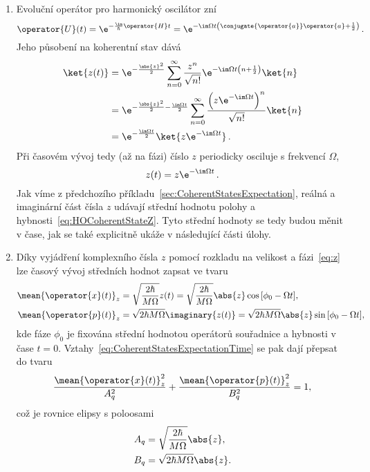 \begin{solution}
	\begin{enumerate}
	\item
		Evoluční operátor pro harmonický oscilátor zní
		\begin{equation}
			\operator{U}(t)
				=\e^{-\frac{\im}{\hbar}\operator{H}t}
				=\e^{-\im\Omega t\left(\conjugate{\operator{a}}\operator{a}+\frac{1}{2}\right)}\,.
		\end{equation}
		Jeho působení na koherentní stav dává
		\begin{align}
			\ket{z(t)}
				&=\e^{-\frac{\abs{z}^{2}}{2}}\sum_{n=0}^{\infty}\frac{z^{n}}{\sqrt{n!}}
					\e^{-\im\Omega t\left(n+\frac{1}{2}\right)}\ket{n}\nonumber\\
				&=\e^{-\frac{\abs{z}^{2}}{2}-\frac{\im\Omega t}{2}}\sum_{n=0}^{\infty}
					\frac{\left(z\e^{-\im\Omega t}\right)^{n}}{\sqrt{n!}}\ket{n}\nonumber\\
				&=\e^{-\frac{\im\Omega t}{2}}\ket{z\e^{-\im\Omega t}}\,.
		\end{align}
		Při časovém vývoj tedy (až na fázi) číslo $z$ periodicky osciluje s frekvencí $\Omega$,
		\begin{equation}
			z(t)=z\e^{-\im\Omega t}\,.
		\end{equation}
		Jak víme z předchozího příkladu~\ref{sec:CoherentStatesExpectation}, reálná a imaginární část čísla $z$ udávají střední hodnotu polohy a hybnosti~\eqref{eq:HOCoherentStateZ}.
		Tyto střední hodnoty se tedy budou měnit v čase, jak se také explicitně ukáže v následující části úlohy.
		
	\item
		Díky vyjádření komplexního čísla $z$ pomocí rozkladu na velikost a fázi~\eqref{eq:z} lze časový vývoj středních hodnot zapsat ve tvaru
		\begin{subequations}
			\begin{align}
				\mean{\operator{x}(t)}_{z}
					&=\sqrt{\frac{2\hbar}{M\Omega}}\real{z(t)}
					=\sqrt{\frac{2\hbar}{M\Omega}}\abs{z}\cos{\left[\phi_{0}-\Omega t\right]},\\
				\mean{\operator{p}(t)}_{z}
					&=\sqrt{2\hbar M\Omega}\imaginary{z(t)}
					=\sqrt{2\hbar M\Omega}\abs{z}\sin{\left[\phi_{0}-\Omega t\right]},
			\end{align}
			\label{eq:CoherentStatesExpectationTime}
		\end{subequations}
		kde fáze $\phi_{0}$ je fixována střední hodnotou operátorů souřadnice a hybnosti v čase $t=0$.
		Vztahy~\eqref{eq:CoherentStatesExpectationTime} se pak dají přepsat do tvaru
		\begin{equation}
			\frac{\mean{\operator{x}(t)}_{z}^{2}}{A_{q}^{2}}
				+\frac{\mean{\operator{p}(t)}_{z}^{2}}{B_{q}^{2}}=1,
		\end{equation}
		což je rovnice elipsy s poloosami
		\begin{subequations}
			\begin{align}
				A_{q}&=\sqrt{\frac{2\hbar}{M\Omega}}\abs{z},\\
				B_{q}&=\sqrt{2\hbar M\Omega}\abs{z}.
			\end{align}
		\end{subequations}
		

\end{enumerate}
\end{solution}
